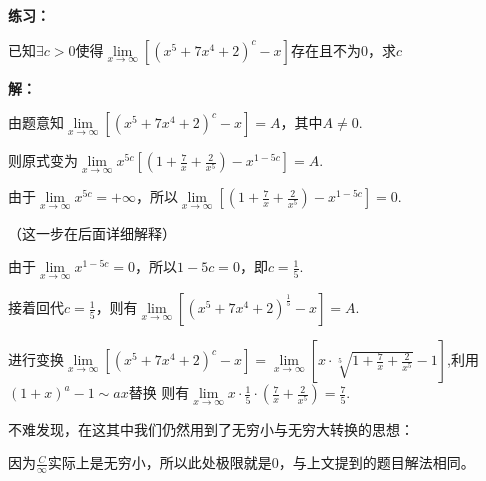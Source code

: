\documentclass[12pt , a4paper , oneside]{ctexart}
\begin{document}
            \textbf{练习：}

            已知$\exists c>0$使得$\lim\limits_{x \to \infty}[ (x^5 + 7x^4 + 2)^c - x ]$存在且不为$0$，求$c$
            \begin{mdframed}
            \textbf{解：}

            由题意知$\lim\limits_{x \to \infty}[ (x^5 + 7x^4 + 2)^c - x ] = A$，其中$A \neq 0$.

            则原式变为$\lim\limits_{x \to \infty} x^{5c} [(1 + \frac{7}{x} + \frac{2}{x^5}) - x^{1-5c}] = A$.

            由于$\lim\limits_{x \to \infty} x^{5c} = +\infty$，所以$\lim\limits_{x \to \infty} [(1 + \frac{7}{x} + \frac{2}{x^5}) - x^{1-5c}] = 0$.

            {\fangsong （这一步在后面详细解释）}

            由于$\lim\limits_{x \to \infty} x^{1-5c} = 0$，所以$1-5c = 0$，即$c = \frac{1}{5}$.

            接着回代$c = \frac{1}{5}$，则有$\lim\limits_{x \to \infty} [ (x^5 + 7x^4 + 2)^\frac{1}{5} - x ] = A$.

            进行变换$\lim\limits_{x \to \infty}[ (x^5 + 7x^4 + 2)^c - x ] = 
            \lim\limits_{x \to \infty}[x \cdot \sqrt[5]{1+\frac{7}{x}+\frac{2}{x^5}} - 1 ]$,利用$(1+x)^a -1 \sim ax$替换
            则有$\lim\limits_{x \to \infty} x \cdot \frac{1}{5} \cdot (\frac{7}{x} + \frac{2}{x^5}) = \frac{7}{5}$.

            \end{mdframed}

            不难发现，在这其中我们仍然用到了无穷小与无穷大转换的思想：

            \begin{center}
            \end{center}

            因为$\frac{C}{\infty}$实际上是无穷小，所以此处极限就是$0$，与上文提到的题目解法相同。
\end{document}
